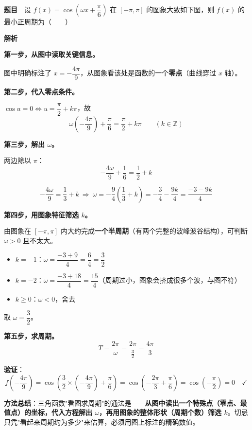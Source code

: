\par\medskip


\textbf{题目}　设 $f(x)=\cos\left(\omega x+\dfrac\pi6\right)$ 在 $[-\pi,\pi]$ 的图象大致如下图，则 $f(x)$ 的最小正周期为（　　）

\begin{center}\end{center}

\textbf{解析}

\textbf{第一步，从图中读取关键信息。}

图中明确标注了 $x=-\dfrac{4\pi}9$，从图象看该处是函数的一个\textbf{零点}（曲线穿过 $x$ 轴）。

\textbf{第二步，代入零点条件。}

$\cos u=0\iff u=\dfrac\pi2+k\pi$，故
\[\omega\left(-\frac{4\pi}9\right)+\frac\pi6=\frac\pi2+k\pi\qquad(k\in\mathbb Z)\]

\textbf{第三步，解出 $\omega$。}

两边除以 $\pi$：
\[-\frac{4\omega}9+\frac16=\frac12+k\]

\[-\frac{4\omega}9=\frac13+k\ \Longrightarrow\ \omega=-\frac94\left(\frac13+k\right)=-\frac34-\frac{9k}4=\frac{-3-9k}4\]

\textbf{第四步，用图象特征筛选 $k$。}

由图象在 $[-\pi,\pi]$ 内大约完成\textbf{一个半周期}（有两个完整的波峰波谷结构），可判断 $\omega>0$ 且不太大。

\begin{itemize}
\item $k=-1$：$\omega=\dfrac{-3+9}4=\dfrac64=\dfrac32$ 
\item $k=-2$：$\omega=\dfrac{-3+18}4=\dfrac{15}4$（周期过小，图象会挤成很多个波，与图不符）
\item $k\ge0$：$\omega<0$，舍去
\end{itemize}

取 $\omega=\dfrac32$。

\textbf{第五步，求周期。}
\[T=\frac{2\pi}\omega=\frac{2\pi}{\frac32}=\frac{4\pi}3\]

\textbf{验证}：
\[f\left(-\frac{4\pi}9\right)=\cos\left(\frac32\times\left(-\frac{4\pi}9\right)+\frac\pi6\right)=\cos\left(-\frac{2\pi}3+\frac\pi6\right)=\cos\left(-\frac\pi2\right)=0\quad\checkmark\]


\begin{gktip}
\textbf{方法总结}：三角函数"看图求周期"的通法是——\textbf{从图中读出一个特殊点（零点、最值点）的坐标，代入方程解出 $\omega$，再用图象的整体形状（周期个数）筛选 $k$}。切忌只凭"看起来周期约为多少"来估算，必须用图上标注的精确数值。
\end{gktip}

